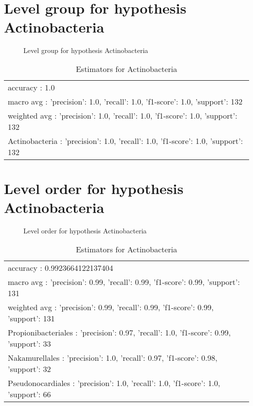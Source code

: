 \documentclass[12pt]{article}
\begin{document}
\clearpage
\pagebreak[4]
\section*{Level group for hypothesis Actinobacteria}
\begin{figure}[h]
\centering


\caption{Level group for hypothesis Actinobacteria}
\label{f-Level group for hypothesis Actinobacteria}
\end{figure}
\begin{table}[htp]
\begin{tabular}{l}
accuracy : 1.0 \\
macro avg : {'precision': 1.0, 'recall': 1.0, 'f1-score': 1.0, 'support': 132} \\
weighted avg : {'precision': 1.0, 'recall': 1.0, 'f1-score': 1.0, 'support': 132} \\
Actinobacteria : {'precision': 1.0, 'recall': 1.0, 'f1-score': 1.0, 'support': 132}
\end{tabular}
\caption*{Estimators for Actinobacteria}
\end{table}




\clearpage
\pagebreak[4]
\section*{Level order for hypothesis Actinobacteria}
\begin{figure}[h]
\centering


\caption{Level order for hypothesis Actinobacteria}
\label{f-Level order for hypothesis Actinobacteria}
\end{figure}
\begin{table}[htp]
\begin{tabular}{l}
accuracy : 0.9923664122137404 \\
macro avg : {'precision': 0.99, 'recall': 0.99, 'f1-score': 0.99, 'support': 131} \\
weighted avg : {'precision': 0.99, 'recall': 0.99, 'f1-score': 0.99, 'support': 131} \\
Propionibacteriales : {'precision': 0.97, 'recall': 1.0, 'f1-score': 0.99, 'support': 33} \\
Nakamurellales : {'precision': 1.0, 'recall': 0.97, 'f1-score': 0.98, 'support': 32} \\
Pseudonocardiales : {'precision': 1.0, 'recall': 1.0, 'f1-score': 1.0, 'support': 66}
\end{tabular}
\caption*{Estimators for Actinobacteria}
\end{table}
\end{document}
